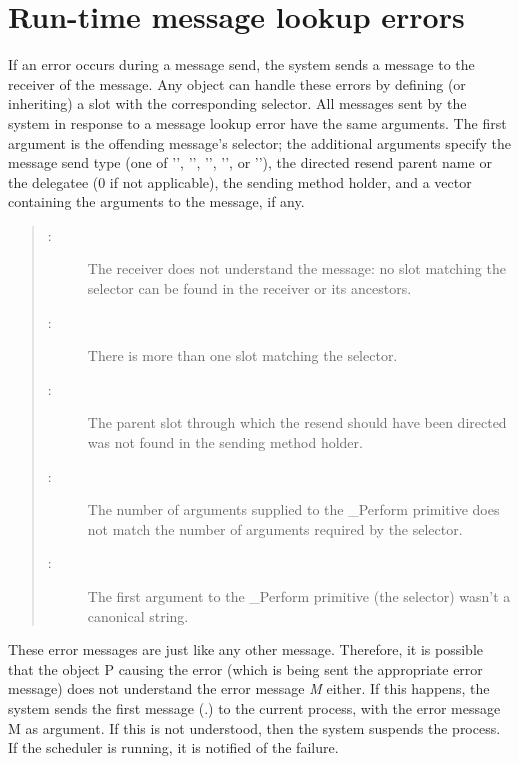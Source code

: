 \documentclass[letterpaper,10pt,english]{sphinxmanual}
\begin{document}
\section{Run-time message lookup errors}
\label{vmref:index-6}\label{vmref:run-time-message-lookup-errors}
If an error occurs during a message send, the system sends a message to the receiver of the message.
Any object can handle these errors by defining (or inheriting) a slot with the corresponding
selector. All messages sent by the system in response to a message lookup error have the same arguments.
The first argument is the offending message’s selector; the additional arguments specify
the message send type (one of ’’, ’’, ’’, ’’,
or ’’), the directed resend parent name or the delegatee (0 if not
applicable), the sending method holder, and a vector containing the arguments to the message, if
any.
\begin{quote}
\begin{description}
\item[{:}] \leavevmode
The receiver does not understand the message: no slot matching the selector can be found in the receiver or its ancestors.

\item[{:}] \leavevmode
There is more than one slot matching the selector.

\item[{:}] \leavevmode
The parent slot through which the resend should have been directed was not found in the sending method holder.

\item[{:}] \leavevmode
The number of arguments supplied to the \_Perform primitive does not match the number of arguments required by the selector.

\item[{:}] \leavevmode
The first argument to the \_Perform primitive (the selector) wasn’t a canonical string.

\end{description}
\end{quote}

These error messages are just like any other message. Therefore, it is possible that the object P
causing the error (which is being sent the appropriate error message) does not understand the error
message \emph{M} either. If this happens, the system sends the first message (.) to
the current process, with the error message M as argument. If this is not understood, then the system
suspends the process. If the scheduler is running, it is notified of the failure.
\end{document}
